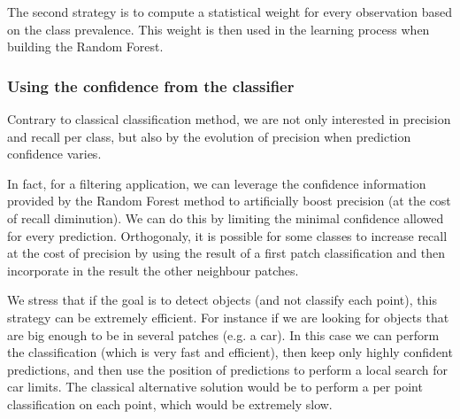 		The second strategy is to compute a statistical weight for every observation based on the class prevalence. 
		This weight is then used in the learning process when building the Random Forest.
		
		\subsubsection{Using the confidence from the classifier} 
		\label{lod.method.classification.using_confidence}
		Contrary to classical classification method, we are not only interested in precision and recall per class, but also by the evolution of precision when prediction confidence varies.
		
		In fact, for a filtering application, we can leverage the confidence information provided by the Random Forest method to artificially boost precision (at the cost of recall diminution). We can do this by limiting the minimal confidence allowed for every prediction.
		Orthogonaly, it is possible for some classes to increase recall at the cost of precision by using the result of a first patch classification and then incorporate in the result the other neighbour patches. 
		
		We stress that if the goal is to detect objects (and not classify each point), this strategy can be extremely efficient.
		For instance if we are looking for objects that are big enough to be in several patches (e.g. a car).
		In this case we can perform the classification (which is very fast and efficient), then keep only highly confident predictions, and then use the position of predictions to perform a local search for car limits.
		The classical alternative solution would be to perform a per point classification on each point, which would be extremely slow.
		 